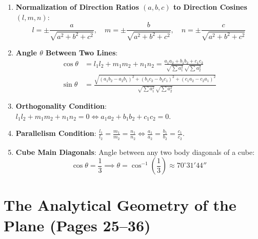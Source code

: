 \begin{theorembox}
\begin{enumerate}
    \item \textbf{Normalization of Direction Ratios $(a, b, c)$ to Direction Cosines $(l, m, n)$}:
    \begin{equation}
        \boxed{l = \pm\frac{a}{\sqrt{a^2 + b^2 + c^2}}, \quad m = \pm\frac{b}{\sqrt{a^2 + b^2 + c^2}}, \quad n = \pm\frac{c}{\sqrt{a^2 + b^2 + c^2}}}
    \end{equation}
    \item \textbf{Angle $\theta$ Between Two Lines}:
    \begin{align}
        \cos\theta &= \boxed{l_1 l_2 + m_1 m_2 + n_1 n_2 = \frac{a_1 a_2 + b_1 b_2 + c_1 c_2}{\sqrt{\sum a_1^2}\,\sqrt{\sum a_2^2}}} \\
        \sin\theta &= \boxed{\frac{\sqrt{(a_1 b_2 - a_2 b_1)^2 + (b_1 c_2 - b_2 c_1)^2 + (c_1 a_2 - c_2 a_1)^2}}{\sqrt{\sum a_1^2}\,\sqrt{\sum a_2^2}}}
    \end{align}
    \item \textbf{Orthogonality Condition}: $\displaystyle \boxed{l_1 l_2 + m_1 m_2 + n_1 n_2 = 0 \iff a_1 a_2 + b_1 b_2 + c_1 c_2 = 0}$.
    \item \textbf{Parallelism Condition}: $\displaystyle \boxed{\frac{l_1}{l_2} = \frac{m_1}{m_2} = \frac{n_1}{n_2} \iff \frac{a_1}{a_2} = \frac{b_1}{b_2} = \frac{c_1}{c_2}}$.
    \item \textbf{Cube Main Diagonals}: Angle between any two body diagonals of a cube:
    \begin{equation}
        \boxed{\cos\theta = \frac{1}{3} \implies \theta = \cos^{-1}\left(\frac{1}{3}\right) \approx 70^\circ 31' 44''}
    \end{equation}
\end{enumerate}
\end{theorembox}

\section{The Analytical Geometry of the Plane (Pages 25--36)}

